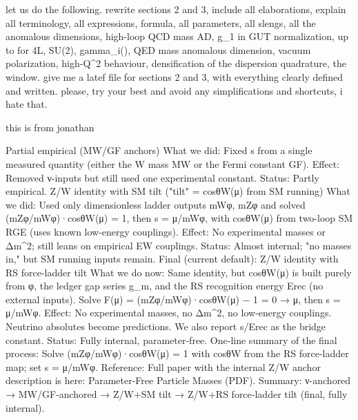 \documentclass[%
 amsmath,amssymb,
 aps,
prb,
floatfix, showkeys
]{revtex4-2}
\begin{document}
        let us do the following. rewrite sections 2 and 3, include all elaborations, explain all terminology, all expressions, formula, all parameters, all slengs,  all the anomalous dimensions, high-loop QCD mass AD, g_1 in GUT normalization, up to for 4L, SU(2), gamma_i(\mu), QED mass anomalous dimension, vacuum polarization,  high-Q^2 behaviour, densification of the dispersion quadrature, the \tau window. give me a latef file for sections 2 and 3,  with everything clearly defined and written. please, try your best and avoid any simplifications and shortcuts, i hate that.




        this is from jonathan

Partial empirical (MW/GF anchors)
What we did: Fixed s from a single measured quantity (either the W mass MW or the Fermi constant GF).
Effect: Removed ν-inputs but still used one experimental constant.
Status: Partly empirical.
Z/W identity with SM tilt ("tilt" = cosθW(μ) from SM running)
What we did: Used only dimensionless ladder outputs mWφ, mZφ and solved
(mZφ/mWφ)·cosθW(μ) = 1, then s = μ/mWφ,
with cosθW(μ) from two-loop SM RGE (uses known low-energy couplings).
Effect: No experimental masses or Δm^2; still leans on empirical EW couplings.
Status: Almost internal; "no masses in," but SM running inputs remain.
Final (current default): Z/W identity with RS force-ladder tilt
What we do now: Same identity, but cosθW(μ) is built purely from φ, the ledger gap series g_m, and the RS recognition energy Erec (no external inputs).
Solve F(μ) = (mZφ/mWφ)·cosθW(μ) − 1 = 0 → μ, then s = μ/mWφ.
Effect: No experimental masses, no Δm^2, no low‑energy couplings. Neutrino absolutes become predictions. We also report s/Erec as the bridge constant.
Status: Fully internal, parameter‑free.
One‑line summary of the final process:
Solve (mZφ/mWφ)·cosθW(μ) = 1 with cosθW from the RS force‑ladder map; set s = μ/mWφ.
Reference:
Full paper with the internal Z/W anchor description is here: Parameter‑Free Particle Masses (PDF).
Summary:
ν-anchored → MW/GF‑anchored → Z/W+SM tilt → Z/W+RS force‑ladder tilt (final, fully internal).        
        










        
\end{document}
